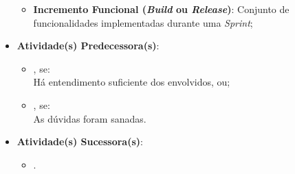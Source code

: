 \begin{itemize}
{						\begin{itemize}
							\item{\textbf{Incremento Funcional (\emph{Build} ou \emph{Release})}: Conjunto de funcionalidades implementadas durante uma \emph{Sprint};}
						\end{itemize}}
					\item{\textbf{Atividade(s) Predecessora(s)}:
						\begin{itemize}
							\item{, se:
								\\ Há entendimento suficiente dos envolvidos, ou;}
							\item{, se:
								\\ As dúvidas foram sanadas.}
						\end{itemize}}
					\item{\textbf{Atividade(s) Sucessora(s)}:
						\begin{itemize}
							\item{.}
						\end{itemize}}
				\end{itemize}


